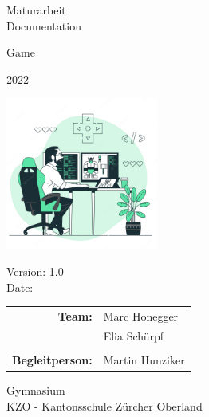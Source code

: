 \begin{titlepage}

    \begin{center}

        \vspace{1 cm}

        {\Large Maturarbeit \\ Documentation} \\

        \vspace{0.5cm}

        {\Huge Game}

        \vspace{0.5cm}

        2022 

        \vspace{1 cm}

        \includegraphics[height=5cm]{resources/DummyLogo.jpg}

        \vspace{1 cm}

        Version: 1.0 \\
        Date: \DTMnow \\
        \vspace{1 cm}

        \begin{tabular}{rl}
            \textbf{Team:}    & Marc Honegger \\
                                      & Elia Schürpf \\
                                        \\
            \textbf{Begleitperson:} & Martin Hunziker
        \end{tabular}

        \vfill

        \vspace{1cm}
        Gymnasium \\
        KZO - Kantonsschule Zürcher Oberland

    \end{center}

\end{titlepage}
